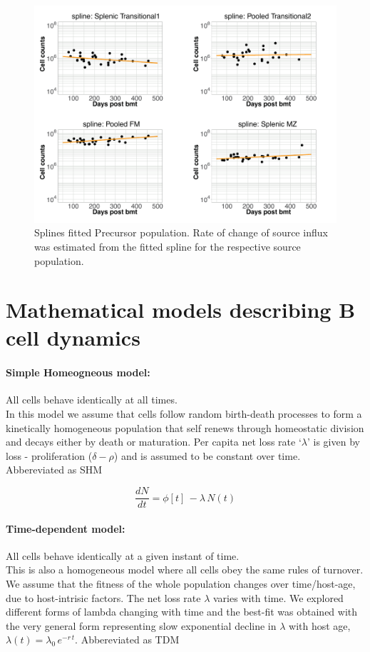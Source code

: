 \documentclass[11pt]{article}
\newcommand{\be}{\begin{equation}}
\newcommand{\ee}{\end{equation}}
\begin{document}
\begin{figure}[h!]
	\centerline{\includegraphics[scale = 1] {source.pdf}}
	\caption{Splines fitted Precursor population. Rate of change of source influx was estimated from the fitted spline for the respective source population. \label{fig:source}}
\end{figure}


\section*{Mathematical models describing B cell dynamics}

\paragraph*{Simple Homeogneous model:}
All cells behave identically at all times. \\
In this model we assume that cells follow random birth-death processes to form a kinetically homogeneous population that self renews through homeostatic division and decays either by death or maturation. 
Per capita net loss rate `$\lambda$' is given by loss - proliferation ($\delta - \rho$)  and is assumed to be constant over time. \\
Abbereviated as SHM

\be
\frac{dN}{dt} = \phi[t] \, - \lambda \, N(t)
\label{eq:SHM}
\ee

\paragraph*{Time-dependent model:} 
All cells behave identically at a given instant of time. \\
This is also a homogeneous model where all cells obey the same rules of turnover. We assume that the fitness of the whole population changes over time/host-age, due to host-intrisic factors. 
The net loss rate $\lambda$ varies with time. We explored different forms of lambda changing with time and the best-fit was obtained with the very general form representing slow exponential decline in $\lambda$ with host age, $\lambda(t) = \lambda_0 \, e^{-r\,t}$.
Abbereviated as TDM
\end{document}
